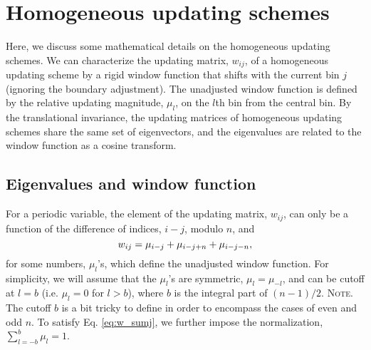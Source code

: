 \documentclass[preprint, superscriptaddress, floatfix]{revtex4-1}
\newcommand{\note}[1]{{\color{DarkGreen}\footnotesize \textsc{Note.} #1}}
\begin{document}
\section{\label{sec:homo}
Homogeneous updating schemes
}


Here, we discuss some mathematical details
on the homogeneous updating schemes.
%
We can characterize
the updating matrix, $w_{ij}$,
of a homogeneous updating scheme
by a rigid window function
that shifts with the current bin $j$
(ignoring the boundary adjustment).
%
The unadjusted window function is defined by
the relative updating magnitude, $\mu_l$,
on the $l$th bin from the central bin.
%
%
By the translational invariance,
the updating matrices of homogeneous updating schemes
share the same set of eigenvectors,
and the eigenvalues
are related to the window function as a cosine transform.



\subsection{\label{sec:wband_eig}
Eigenvalues and window function}



For a periodic variable\cite{dama2014},
the element of the updating matrix, $w_{ij}$,
can only be a function of the difference of indices, $i-j$, modulo $n$,
and
%
\begin{equation}
  w_{ij}
  =
  \mu_{i-j}
  +
  \mu_{i-j+n}
  +
  \mu_{i-j-n}
  ,
  \notag
\end{equation}
%
for some numbers, $\mu_l$'s, which
define the unadjusted window function.
%
For simplicity, we will assume that
the $\mu_l$'s are symmetric, $\mu_l = \mu_{-l}$,
and can be cutoff at $l = b$
(i.e. $\mu_l = 0$ for $l > b$),
where $b$ is the integral part of $(n-1)/2$.
%
\note{The cutoff $b$ is a bit tricky to define
in order to encompass the cases of even and odd $n$.}%
%
To satisfy Eq. \eqref{eq:w_sumj}, we further impose
the normalization, $\sum_{l=-b}^b \mu_l = 1$.
%
\end{document}
